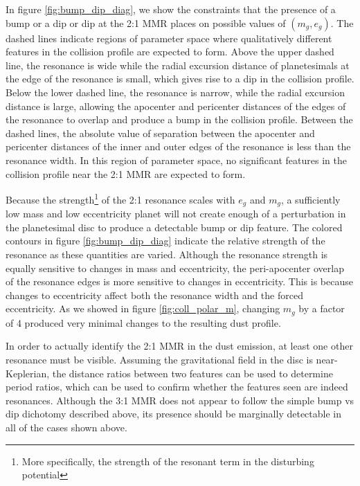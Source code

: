 \documentclass[fleqn,usenatbib]{mnras}
\begin{document}
In figure \ref{fig:bump_dip_diag}, we show the constraints that the presence of a bump or a dip or dip at the 2:1 MMR places on possible values of $(m_{g}, e_{g})$. The dashed
lines indicate regions of parameter space where qualitatively different features in the collision profile are expected to form. Above the upper dashed line, the 
resonance is wide while the radial excursion distance of planetesimals at the edge of the resonance is small, which gives rise to a dip in the collision profile. 
Below the lower dashed line, the resonance is narrow, while the radial excursion distance is large, allowing the apocenter and pericenter distances of the edges 
of the resonance to overlap and produce a bump in the collision profile. Between the dashed lines, the absolute value of separation between the apocenter and 
pericenter distances of the inner and outer edges of the resonance is less than the resonance width. In this region of parameter space, no significant features in 
the collision profile near the 2:1 MMR are expected to form. 

Because the strength\footnote{More specifically, the strength of the resonant term in the disturbing potential} of the 2:1 resonance scales with $e_{g}$ and  $m_{g}$, a sufficiently low mass and low eccentricity planet will not create 
enough of a perturbation in the planetesimal disc to produce a detectable bump or dip feature. The colored contours in figure \ref{fig:bump_dip_diag} 
indicate the relative strength of the resonance as these quantities are varied. Although the resonance strength is equally sensitive to changes in 
mass and eccentricity, the peri-apocenter overlap of the resonance edges is more sensitive to changes in eccentricity. This is because changes to 
eccentricity affect both the resonance width and the forced eccentricity. As we showed in figure \ref{fig:coll_polar_m}, changing $m_{g}$ by a factor 
of 4 produced very minimal changes to the resulting dust profile.

In order to actually identify the 2:1 MMR in the dust emission, at least one other resonance must be visible. Assuming the gravitational field in the 
disc is near-Keplerian, the distance ratios between two features can be used to determine period ratios, which can be used to confirm whether the 
features seen are indeed resonances. Although the 3:1 MMR does not appear to follow the simple bump vs dip dichotomy described above, its 
presence should be marginally detectable in all of the cases shown above.
\end{document}
